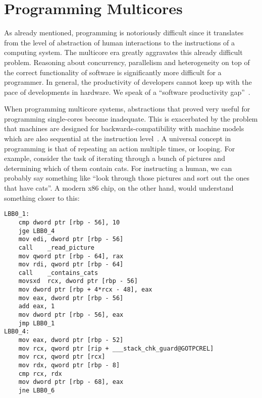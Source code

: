 \section{Programming Multicores}

As already mentioned, programming is notoriously difficult since it translates from the level of abstraction of human interactions to the instructions of a computing system.
The multicore era greatly aggravates this already difficult problem.
Reasoning about concurrency, parallelism and heterogeneity on top of the correct functionality of software is significantly more difficult for a programmer.
In general, the productivity of developers cannot keep up with the pace of developments in hardware.
We speak of a ``software productivity gap''~\cite{ecker2009hardware,castrillon2014thesis}. 

When programming multicore systems, abstractions that proved very useful for programming single-cores become inadequate.
This is exacerbated by the problem that machines are designed for backwards-compatibility with machine models which are also sequential at the instruction level~\cite{cisnotll}.
A universal concept in programming is that of repeating an action multiple times, or looping. 
For example, consider the task of iterating through a bunch of pictures and determining which of them contain cats.
For instructing a human, we can probably say something like ``look through those pictures and sort out the ones that have cats''.
A modern x86 chip, on the other hand, would understand something closer to this:

\begin{verbatim}
LBB0_1:                                 
	cmp	dword ptr [rbp - 56], 10
	jge	LBB0_4
	mov	edi, dword ptr [rbp - 56]
	call	_read_picture
	mov	qword ptr [rbp - 64], rax
	mov	rdi, qword ptr [rbp - 64]
	call	_contains_cats
	movsxd	rcx, dword ptr [rbp - 56]
	mov	dword ptr [rbp + 4*rcx - 48], eax
	mov	eax, dword ptr [rbp - 56]
	add	eax, 1
	mov	dword ptr [rbp - 56], eax
	jmp	LBB0_1
LBB0_4:
	mov	eax, dword ptr [rbp - 52]
	mov	rcx, qword ptr [rip + ___stack_chk_guard@GOTPCREL]
	mov	rcx, qword ptr [rcx]
	mov	rdx, qword ptr [rbp - 8]
	cmp	rcx, rdx
	mov	dword ptr [rbp - 68], eax 
	jne	LBB0_6
\end{verbatim}

